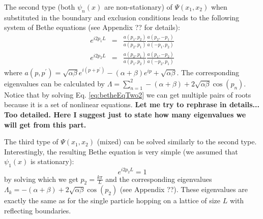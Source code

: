 \documentclass[aps,showpacs,twocolumn,floatfix,prx,superscriptaddress]{revtex4-1}
\begin{document}
The second type (both $\psi_n(x)$ are non-stationary) of $\Psi(x_1, x_2)$ when substituted in the boundary and exclusion conditions leads to the following system of Bethe equations \cite{} (see Appendix ?? for details):
\begin{subequations}
    \label{eq:betheEqTwo2}
    \begin{eqnarray}
        e^{i2p_1L} & = & \frac{a(p_1, p_2)}{a(p_2, p_1)} 
        \frac{a(p_2, -p_1)}{a(-p_1, p_2)}\\
        e^{i2p_2L} & = & \frac{a(p_2, p_1)}{a(p_1, p_2)} 
        \frac{a(p_1, -p_2)}{a(-p_2, p_1)}
    \end{eqnarray}
\end{subequations}
where $a(p, p^\prime) = \sqrt{\alpha\beta}e^{i(p+p^\prime)}-(\alpha+\beta)e^{ip}+\sqrt{\alpha\beta}$. 
The corresponding eigenvalues can be calculated by $\Lambda = \sum_{n=1}^2 -(\alpha+\beta)+2\sqrt{\alpha\beta}\cos(p_n)$. Notice that by solving Eq. \eqref{eq:betheEqTwo2} we can get multiple pairs of roots because it is a set of nonlinear equations. 
{\bf Let me try to rephrase in details... Too detailed. Here I suggest just to state how many eigenvalues we will get from this part.} 

The third type of $\Psi(x_1, x_2)$ (mixed) can be solved similarly to the second type. Interestingly, the resulting Bethe equation is very simple (we assumed that $\psi_1(x)$ is stationary):
\begin{equation}
    \label{eq:betheEqTwo1}
    e^{i2p_2L} = 1
\end{equation}
by solving which we get $p_2 = \frac{k\pi}{L}$ and the corresponding eigenvalues $\Lambda_k = -(\alpha+\beta)+2\sqrt{\alpha\beta}\cos(p_2)$ (see Appendix ??). These eigenvalues are exactly the same as for the single particle hopping on a lattice of size $L$ with reflecting boundaries. 
\end{document}
